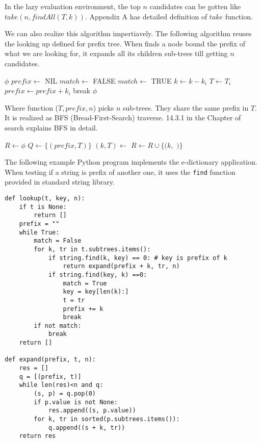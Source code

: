 \documentclass{article}
\begin{document}
In the lazy evaluation environment, the top $n$ candidates can be
gotten like $take(n, findAll(T, k))$. Appendix A has detailed definition
of $take$ function.

We can also realize this algorithm impertiavely.
The following algorithm reuses the looking up defined for prefix tree. When
finds a node bound the prefix of what we are looking for,
it expands all its children sub-trees till getting $n$ candidates.

\begin{algorithmic}[1]
     \State \Return $\phi$
  \EndIf
  \State $prefix \gets$ NIL
  \Repeat
    \State $match \gets$ FALSE
        \State \Return {}
      \EndIf
        \State $match \gets$ TRUE
        \State $k \gets k - k_i$
        \State $T \gets T_i$
        \State $prefix \gets prefix + k_i$
        \State break
      \EndIf
    \EndFor
  \State \Return $\phi$
\EndFunction
\end{algorithmic}

Where function ($T, prefix, n$) picks $n$ sub-trees. They
share the same prefix in $T$. It is realized as BFS (Bread-First-Search) traverse. 14.3.1 in the Chapter of search explains BFS in detail.

\begin{algorithmic}[1]
  \State $R \gets \phi$
  \State $Q \gets \{(prefix, T)\}$
    \State $(k, T) \gets$ 
      \State $R \gets R \cup \{(k, $  $)\}$
    \EndIf
      \State {}
    \EndFor
  \EndWhile
\EndFunction
\end{algorithmic}

The following example Python program implements the e-dictionary application.
When testing if a string is prefix of another one, it uses the \texttt{find}
function provided in standard string library.

\lstset{language=Python}
\begin{lstlisting}
def lookup(t, key, n):
    if t is None:
        return []
    prefix = ""
    while True:
        match = False
        for k, tr in t.subtrees.items():
            if string.find(k, key) == 0: # key is prefix of k
                return expand(prefix + k, tr, n)
            if string.find(key, k) ==0:
                match = True
                key = key[len(k):]
                t = tr
                prefix += k
                break
        if not match:
            break
    return []

def expand(prefix, t, n):
    res = []
    q = [(prefix, t)]
    while len(res)<n and q:
        (s, p) = q.pop(0)
        if p.value is not None:
            res.append((s, p.value))
        for k, tr in sorted(p.subtrees.items()):
            q.append((s + k, tr))
    return res
\end{lstlisting}
\end{document}
